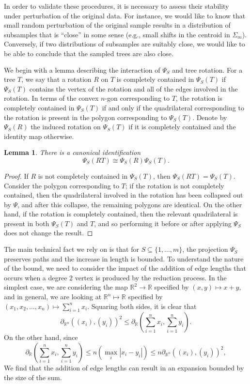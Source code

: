 \documentclass[a4paper,11pt]{article}
\newtheorem{lemma}{Lemma}
\begin{document}
In order to validate these procedures, it is necessary to assess their stability under perturbation of the original data.
For instance, we would like to know that small random perturbation of the original sample results in a distribution of subsamples that is ``close'' in some sense (e.g., small shifts in the centroid in $\Sigma_m$).
Conversely, if two distributions of subsamples are suitably close, we would like to be able to conclude that the sampled trees are also close.

We begin with a lemma describing the interaction of $\Psi_S$ and tree rotation.
For a tree $T$, we say that a rotation $R$ on $T$ is completely contained in $\Psi_S(T)$ if $\Psi_S(T)$ contains the vertex of the rotation and all of the edges involved in the rotation.
In terms of the convex $n$-gon corresponding to $T$, the rotation is completely contained in $\Psi_S(T)$ if and only if the quadrilateral corresponding to the rotation is present in the polygon corresponding to $\Psi_S(T)$.
Denote by $\Psi_S(R)$ the induced rotation on $\Psi_S(T)$ if it is completely contained and the identity map otherwise.

\begin{lemma}\label{lem:rotprojcom}
There is a canonical identification
\[
\Psi_S(RT) \cong \Psi_S(R) \Psi_S(T).
\]
\end{lemma}

\begin{proof}
If $R$ is not completely contained in $\Psi_S(T)$, then $\Psi_S(RT) = \Psi_S(T)$.
Consider the polygon corresponding to $T$; if the rotation is not completely contained, then the quadrilateral involved in the rotation has been collapsed out by $\Psi$, and after this collapse, the remaining polygons are identical.
On the other hand, if the rotation is completely contained, then the relevant quadrilateral is present in both $\Psi_S(T)$ and $T$, and so performing it before or after applying $\Psi_S$ does not change the result.
\end{proof}

The main technical fact we rely on is that for $S \subseteq \{1,\ldots,m\}$, the projection $\Psi_S$ preserves paths and the increase in length is bounded.
To understand the nature of the bound, we need to consider the impact of the addition of edge lengths that occurs when a degree 2 vertex is produced by the reduction process.
In the simplest case, we are considering the map $\mathbb{R}^2 \to \mathbb{R}$ specified by $(x,y) \mapsto x+y$, and in general, we are looking at $\mathbb{R}^n \mapsto \mathbb{R}$ specified by $(x_1, x_2, \ldots, x_n) \mapsto \sum_{i=1}^n x_i$.
Squaring both sides, it is clear that
\[
\partial_{\mathbb{R}^n}((x_i), (y_i))^2 \leq \partial_{\mathbb{R}}(\sum_{i=1}^n x_i, \sum_{i=1}^n y_i).
\]
On the other hand, since 
\[
\partial_{\mathbb{R}}(\sum_{i=1}^n x_i, \sum_{i=1}^n y_i) \leq n(\max_i |x_i - y_i|) \leq n \partial_{\mathbb{R}^n}((x_i), (y_i))^2,
\]
We find that the addition of edge lengths can result in an expansion bounded by the size of the sum.
\end{document}
